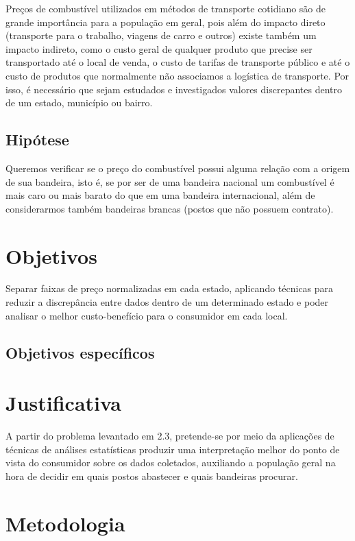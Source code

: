 \documentclass[12pt]{article}
\begin{document}
Preços de combustível utilizados em métodos de transporte cotidiano são de grande importância para a população em geral, pois além do impacto direto (transporte para o trabalho, viagens de carro e outros) existe também um impacto indireto, como o custo geral de qualquer produto que precise ser transportado até o local de venda, o custo de tarifas de transporte público e até o custo de produtos que normalmente não associamos a logística de transporte. Por isso, é necessário que sejam estudados e investigados valores discrepantes dentro de um estado, município ou bairro.

\subsection{Hipótese}

Queremos verificar se o preço do combustível possui alguma relação com a origem de sua bandeira, isto é, se por ser de uma bandeira nacional um combustível é mais caro ou mais barato do que em uma bandeira internacional, além de considerarmos também bandeiras brancas (postos que não possuem contrato).

\section{Objetivos}

Separar faixas de preço normalizadas em cada estado, aplicando técnicas para reduzir a discrepância entre dados dentro de um determinado estado e poder analisar o melhor custo-benefício para o consumidor em cada local.

\subsection{Objetivos específicos}

\section{Justificativa}

A partir do problema levantado em 2.3, pretende-se por meio da aplicações de técnicas de análises estatísticas produzir uma interpretação melhor do ponto de vista do consumidor sobre os dados coletados, auxiliando a população geral na hora de decidir em quais postos abastecer e quais bandeiras procurar.

\section{Metodologia}
\end{document}
